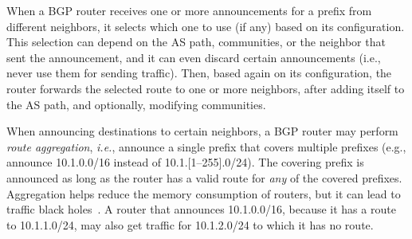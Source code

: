 \documentclass[numbers, 10pt, preprint]{sigplanconf}
\newcommand{\IE}{\emph{i.e.}}
\newcommand{\ETC}{\emph{etc.}}
\begin{document}
When a BGP router receives one or more announcements for a prefix from different neighbors, it selects which one to use (if any) based on its configuration. This selection can depend on the AS path, communities, or the neighbor that sent the announcement, and it can even discard certain announcements (i.e., never use them for sending traffic). Then, based again on its configuration, the router forwards the selected route to one or more neighbors, after adding itself to the AS path, and optionally, modifying communities.


When announcing destinations to certain neighbors, a BGP router may perform {\em route aggregation}, \IE, announce a single prefix that covers multiple prefixes (e.g., announce 10.1.0.0/16 instead of 10.1.[1--255].0/24). The covering prefix is announced as long as the router has a valid route for {\em any} of the covered prefixes. Aggregation helps reduce the memory consumption of routers, but it can lead to traffic black holes~\cite{route-aggregation}. A router that announces 10.1.0.0/16, because it has a route to 10.1.1.0/24, may also get traffic for 10.1.2.0/24 to which it has no route.
\end{document}
